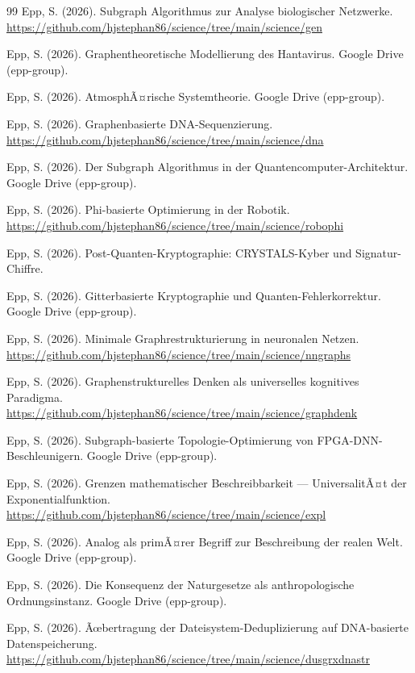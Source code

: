 ﻿\documentclass[a4paper,12pt]{article}
\theoremstyle{definition}
\begin{document}
\begin{thebibliography}{99}
Epp, S. (2026).
Subgraph Algorithmus zur Analyse biologischer Netzwerke.
\url{https://github.com/hjstephan86/science/tree/main/science/gen}

Epp, S. (2026).
Graphentheoretische Modellierung des Hantavirus.
Google Drive (epp-group).

Epp, S. (2026).
AtmosphÃ¤rische Systemtheorie.
Google Drive (epp-group).

Epp, S. (2026).
Graphenbasierte DNA-Sequenzierung.
\url{https://github.com/hjstephan86/science/tree/main/science/dna}

Epp, S. (2026).
Der Subgraph Algorithmus in der Quantencomputer-Architektur.
Google Drive (epp-group).

Epp, S. (2026).
Phi-basierte Optimierung in der Robotik.
\url{https://github.com/hjstephan86/science/tree/main/science/robophi}

Epp, S. (2026).
Post-Quanten-Kryptographie: CRYSTALS-Kyber und Signatur-Chiffre.

Epp, S. (2026).
Gitterbasierte Kryptographie und Quanten-Fehlerkorrektur.
Google Drive (epp-group).

Epp, S. (2026).
Minimale Graphrestrukturierung in neuronalen Netzen.
\url{https://github.com/hjstephan86/science/tree/main/science/nngraphs}

Epp, S. (2026).
Graphenstrukturelles Denken als universelles kognitives Paradigma.
\url{https://github.com/hjstephan86/science/tree/main/science/graphdenk}

Epp, S. (2026).
Subgraph-basierte Topologie-Optimierung von FPGA-DNN-Beschleunigern.
Google Drive (epp-group).

Epp, S. (2026).
Grenzen mathematischer Beschreibbarkeit --- UniversalitÃ¤t der Exponentialfunktion.
\url{https://github.com/hjstephan86/science/tree/main/science/expl}

Epp, S. (2026).
Analog als primÃ¤rer Begriff zur Beschreibung der realen Welt.
Google Drive (epp-group).

Epp, S. (2026).
Die Konsequenz der Naturgesetze als anthropologische Ordnungsinstanz.
Google Drive (epp-group).

Epp, S. (2026).
Ãœbertragung der Dateisystem-Deduplizierung auf DNA-basierte Datenspeicherung.
\url{https://github.com/hjstephan86/science/tree/main/science/dusgrxdnastr}

\end{thebibliography}
\end{document}
